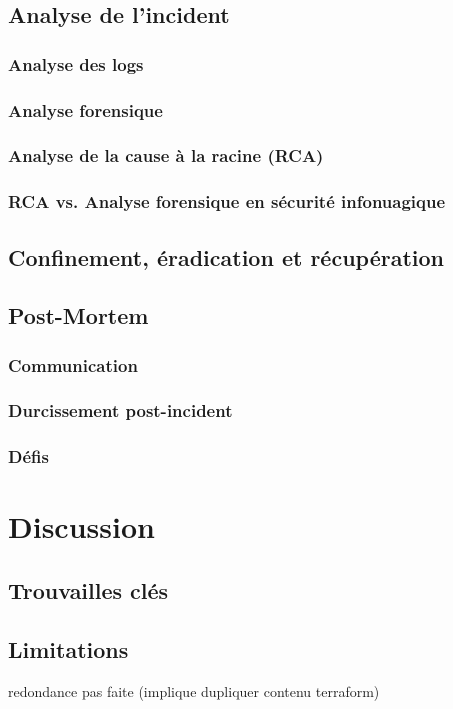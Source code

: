 \documentclass[conference]{IEEEtran}
\begin{document}
\subsection{Analyse de l'incident}
\subsubsection{Analyse des logs}
\subsubsection{Analyse forensique}
\subsubsection{Analyse de la cause à la racine (RCA)}
\subsubsection{RCA vs. Analyse forensique en sécurité infonuagique}
\subsection{Confinement, éradication et récupération}

\subsection{Post-Mortem}
\subsubsection{Communication}
\subsubsection{Durcissement post-incident}
\subsubsection{Défis}

\section{Discussion}

\subsection{Trouvailles clés}

\subsection{Limitations}
redondance pas faite (implique dupliquer contenu terraform)
\end{document}
